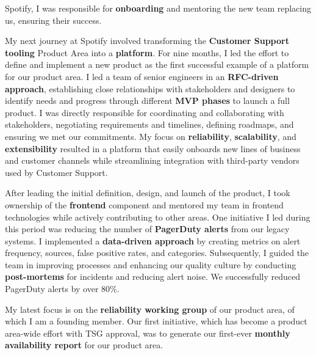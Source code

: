 Spotify, I was responsible for \textbf{onboarding} and mentoring the new team replacing us, ensuring their success.
\smallskip

My next journey at Spotify involved transforming the \textbf{Customer Support tooling} Product Area into a \textbf{platform}. For nine months, I led the effort to define and implement a new product as the first successful example of a platform for our product area. I led a team of senior engineers in an \textbf{RFC-driven approach}, establishing close relationships with stakeholders and designers to identify needs and progress through different \textbf{MVP phases} to launch a full product. I was directly responsible for coordinating and collaborating with stakeholders, negotiating requirements and timelines, defining roadmaps, and ensuring we met our commitments. My focus on \textbf{reliability}, \textbf{scalability}, and \textbf{extensibility} resulted in a platform that easily onboards new lines of business and customer channels while streamlining integration with third-party vendors used by Customer Support.
\smallskip

After leading the initial definition, design, and launch of the product, I took ownership of the \textbf{frontend} component and mentored my team in frontend technologies while actively contributing to other areas. One initiative I led during this period was reducing the number of \textbf{PagerDuty alerts} from our legacy systems. I implemented a \textbf{data-driven approach} by creating metrics on alert frequency, sources, false positive rates, and categories. Subsequently, I guided the team in improving processes and enhancing our quality culture by conducting \textbf{post-mortems} for incidents and reducing alert noise. We successfully reduced PagerDuty alerts by over 80\%.
\smallskip

My latest focus is on the \textbf{reliability working group} of our product area, of which I am a founding member. Our first initiative, which has become a product area-wide effort with TSG approval, was to generate our first-ever \textbf{monthly availability report} for our product area.

